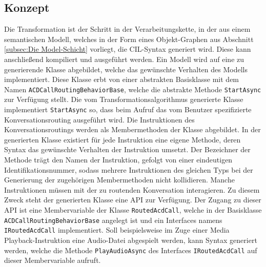 \subsection{Konzept}
\label{subsec:Konzept}
Die Transformation ist der Schritt in der Verarbeitungskette, in der aus einem semantischen Modell, welches in der Form eines Objekt-Graphen aus Abschnitt \ref{subsec:Die Model-Schicht} vorliegt, die CIL-Syntax generiert wird. Diese kann anschließend kompiliert und ausgeführt werden. Ein Modell wird auf eine zu generierende Klasse abgebildet, welche das gewünschte Verhalten des Modells implementiert. Diese Klasse erbt von einer abstrakten Basisklasse mit dem Namen \texttt{ACDCallRoutingBehaviorBase}, welche die abstrakte Methode \texttt{StartAsync} zur Verfügung stellt. Die vom Transformationsalgorithmus generierte Klasse implementiert \texttt{StartAsync} so, dass beim Aufruf das vom Benutzer spezifizierte Konversationsrouting ausgeführt wird.
\newline 
Die Instruktionen des Konversationsroutings werden als Membermethoden der Klasse abgebildet. In der generierten Klasse existiert für jede Instruktion eine eigene Methode, deren Syntax das gewünschte Verhalten der Instruktion umsetzt. Der Bezeichner der Methode trägt den Namen der Instruktion, gefolgt von einer eindeutigen Identifikationsnummer, sodass mehrere Instruktionen des gleichen Typs bei der Generierung der zugehörigen Membermethoden nicht kollidieren. Manche Instruktionen müssen mit der zu routenden Konversation interagieren. Zu diesem Zweck steht der generierten Klasse eine API zur Verfügung. Der Zugang zu  dieser API ist eine Membervariable der Klasse \texttt{RoutedAcdCall}, welche in der Basisklasse \texttt{ACDCallRoutingBehaviorBase} angelegt ist und ein Interfaces namens \texttt{IRoutedAcdCall} implementiert. Soll beispielsweise im Zuge einer Media Playback-Instruktion eine Audio-Datei abgespielt werden, kann Syntax generiert werden, welche die Methode \texttt{PlayAudioAsync} des Interfaces \texttt{IRoutedAcdCall} auf dieser Membervariable aufruft. 
\newline
